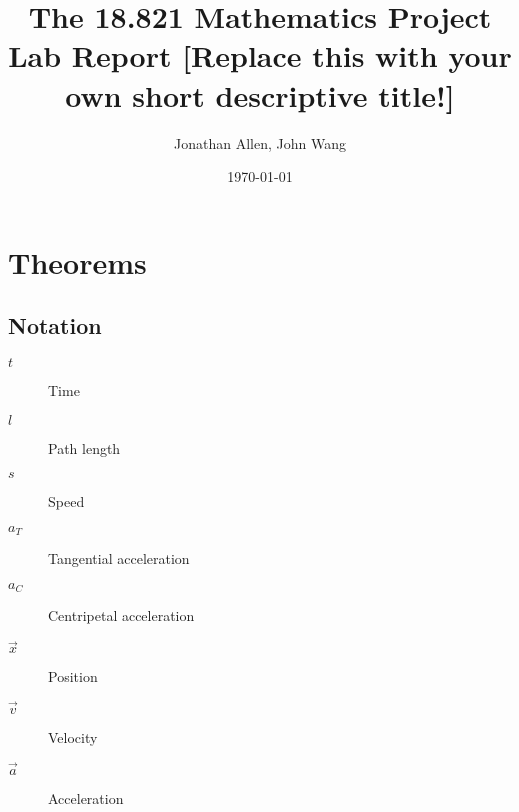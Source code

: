 \documentclass[12pt]{amsart}   %
\begin{document}
\title[The 18.821 report]{The 18.821 Mathematics Project Lab Report 
[Replace this with your own short descriptive title!]} 
 
\author{Jonathan Allen, John Wang}
\date{\today}              %


\newcommand{\C}{\mathbb C} %
\newcommand{\R}{\mathbb R} 
\newcommand{\Z}{\mathbb Z}
\newcommand{\Q}{\mathbb Q}
\newcommand{\N}{\mathbb N}

\maketitle

\section{Theorems}

\subsection{Notation\label{sec:notation}} 

\begin{description}
    \item[$t$] Time
    \item[$l$] Path length
    \item[$s$] Speed
    \item[$a_T$] Tangential acceleration
    \item[$a_C$] Centripetal acceleration
    \item[$\vec{x}$] Position
    \item[$\vec{v}$] Velocity
    \item[$\vec{a}$] Acceleration
\end{description}
\end{document}
